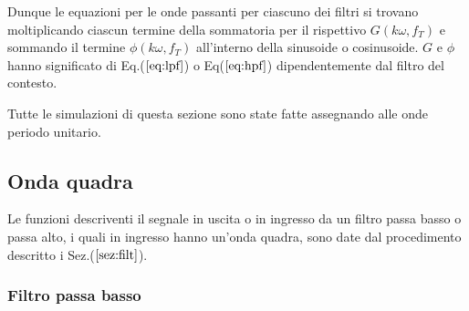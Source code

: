 \documentclass{article}
\begin{document}
    \noindent Dunque le equazioni per le onde passanti per ciascuno dei filtri si trovano
    moltiplicando ciascun termine della sommatoria per il rispettivo 
    $G \left( k\omega,f_T\right)$ e sommando il termine $\phi \left( k\omega,f_T\right)$ 
    all'interno della sinusoide o cosinusoide. $G$ e $\phi$ hanno significato di Eq.($\ref{eq:lpf}$)
    o Eq($\ref{eq:hpf}$) dipendentemente dal filtro del contesto.

    \noindent Tutte le simulazioni di questa sezione sono state fatte assegnando alle onde periodo unitario.
      
    
    \subsection{Onda quadra}
    Le funzioni descriventi il segnale in uscita o in ingresso da un filtro passa basso
    o passa alto, i quali in ingresso hanno un'onda quadra, 
    sono date dal procedimento descritto i Sez.($\ref{sez:filt}$).
        \subsubsection{Filtro passa basso}
            \label{sez:int_quadra}
\end{document}

